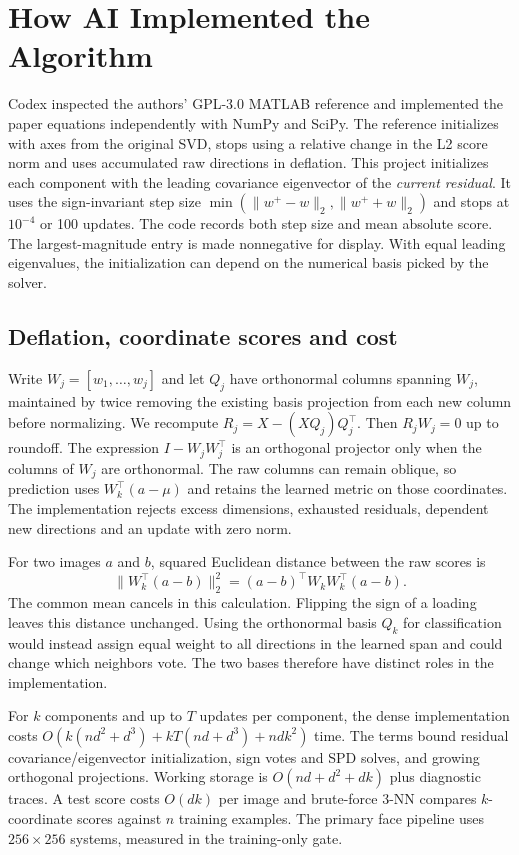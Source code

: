 \section{How AI Implemented the Algorithm}

Codex inspected the authors' GPL-3.0 MATLAB reference \citep{matlab} and implemented the paper equations independently with NumPy and SciPy. The reference initializes with axes from the original SVD, stops using a relative change in the L2 score norm and uses accumulated raw directions in deflation. This project initializes each component with the leading covariance eigenvector of the \emph{current residual}. It uses the sign-invariant step size $\min(\|w^+-w\|_2,\|w^++w\|_2)$ and stops at $10^{-4}$ or 100 updates. The code records both step size and mean absolute score. The largest-magnitude entry is made nonnegative for display. With equal leading eigenvalues, the initialization can depend on the numerical basis picked by the solver.

\subsection{Deflation, coordinate scores and cost}

Write $W_j=[w_1,\ldots,w_j]$ and let $Q_j$ have orthonormal columns spanning $W_j$, maintained by twice removing the existing basis projection from each new column before normalizing. We recompute \(R_j=X-(XQ_j)Q_j^\top\). Then $R_j W_j=0$ up to roundoff. The expression $I-W_jW_j^\top$ is an orthogonal projector only when the columns of $W_j$ are orthonormal. The raw columns can remain oblique, so prediction uses $W_k^\top(a-\mu)$ and retains the learned metric on those coordinates. The implementation rejects excess dimensions, exhausted residuals, dependent new directions and an update with zero norm.

For two images $a$ and $b$, squared Euclidean distance between the raw scores is
\[
 \|W_k^\top(a-b)\|_2^2=(a-b)^\top W_kW_k^\top(a-b).
\]
The common mean cancels in this calculation. Flipping the sign of a loading leaves this distance unchanged. Using the orthonormal basis $Q_k$ for classification would instead assign equal weight to all directions in the learned span and could change which neighbors vote. The two bases therefore have distinct roles in the implementation.

For $k$ components and up to $T$ updates per component, the dense implementation costs $O\!\left(k(nd^2+d^3)+kT(nd+d^3)+ndk^2\right)$ time. The terms bound residual covariance/eigenvector initialization, sign votes and SPD solves, and growing orthogonal projections. Working storage is $O(nd+d^2+dk)$ plus diagnostic traces. A test score costs $O(dk)$ per image and brute-force 3-NN compares $k$-coordinate scores against $n$ training examples. The primary face pipeline uses $256\times256$ systems, measured in the training-only gate.

